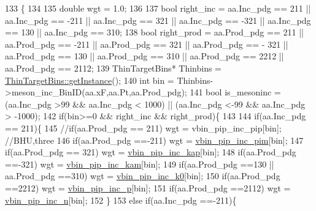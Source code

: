 \begin{DoxyCode}
133                                                                                     \{
134 
135     \textcolor{keywordtype}{double} wgt = 1.0;
136 
137     \textcolor{keywordtype}{bool} right\_inc = aa.Inc\_pdg == 211 || aa.Inc\_pdg == -211 || aa.Inc\_pdg == 321 || aa.Inc\_pdg == -321 || 
      aa.Inc\_pdg == 130 || aa.Inc\_pdg == 310;
138     \textcolor{keywordtype}{bool} right\_prod = aa.Prod\_pdg == 211 || aa.Prod\_pdg == -211 || aa.Prod\_pdg == 321 || aa.Prod\_pdg == -
      321 || aa.Prod\_pdg == 130 || aa.Prod\_pdg == 310 || aa.Prod\_pdg == 2212 || aa.Prod\_pdg == 2112;
139     ThinTargetBins*  Thinbins =  \hyperlink{class_neutrino_flux_reweight_1_1_thin_target_bins_aeff5cf7220dd08322f5abac2cbc7ff33}{ThinTargetBins::getInstance}();
140     \textcolor{keywordtype}{int} bin      = Thinbins->meson\_inc\_BinID(aa.xF,aa.Pt,aa.Prod\_pdg);
141     \textcolor{keywordtype}{bool} is\_mesoninc = (aa.Inc\_pdg >99 && aa.Inc\_pdg < 1000) || (aa.Inc\_pdg <-99 && aa.Inc\_pdg > -1000);
142     \textcolor{keywordflow}{if}(bin>=0 && right\_inc && right\_prod)\{
143 
144       \textcolor{keywordflow}{if}(aa.Inc\_pdg == 211)\{
145         \textcolor{comment}{//if(aa.Prod\_pdg == 211) wgt = vbin\_pip\_inc\_pip[bin];      //BHU,three}
146         \textcolor{keywordflow}{if}(aa.Prod\_pdg ==-211) wgt = \hyperlink{class_neutrino_flux_reweight_1_1_thin_target_meson_incident_reweighter_aaf511004916c8cde16914f776bd24567}{vbin\_pip\_inc\_pim}[bin];
147         \textcolor{keywordflow}{if}(aa.Prod\_pdg == 321) wgt = \hyperlink{class_neutrino_flux_reweight_1_1_thin_target_meson_incident_reweighter_a313579b46a30eab2e8181bdbb616400b}{vbin\_pip\_inc\_kap}[bin];
148         \textcolor{keywordflow}{if}(aa.Prod\_pdg ==-321) wgt = \hyperlink{class_neutrino_flux_reweight_1_1_thin_target_meson_incident_reweighter_a4b9a6dea5fa9006465b9869f7f5a7ef4}{vbin\_pip\_inc\_kam}[bin];
149         \textcolor{keywordflow}{if}(aa.Prod\_pdg ==130 || aa.Prod\_pdg ==310) wgt = \hyperlink{class_neutrino_flux_reweight_1_1_thin_target_meson_incident_reweighter_a4dc56ba2cd4aefe825f48334dc9fd570}{vbin\_pip\_inc\_k0}[bin];
150         \textcolor{keywordflow}{if}(aa.Prod\_pdg ==2212) wgt = \hyperlink{class_neutrino_flux_reweight_1_1_thin_target_meson_incident_reweighter_a094b50773eedca4a30e58067d55b61c7}{vbin\_pip\_inc\_p}[bin];
151         \textcolor{keywordflow}{if}(aa.Prod\_pdg ==2112) wgt = \hyperlink{class_neutrino_flux_reweight_1_1_thin_target_meson_incident_reweighter_a709b2752b6bf405c479a985a136a8c5e}{vbin\_pip\_inc\_n}[bin]; 
152       \}
153       \textcolor{keywordflow}{else} \textcolor{keywordflow}{if}(aa.Inc\_pdg ==-211)\{

\end{DoxyCode}
